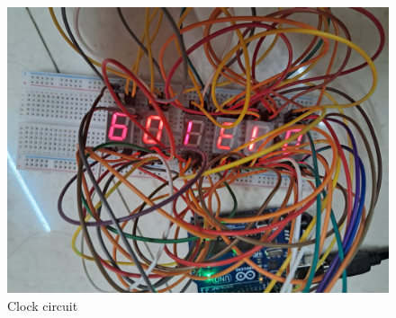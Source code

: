 \documentclass[journal]{IEEEtran}
\begin{document}
\begin{figure}[H]
    \centering
    \includegraphics[width=0.8\linewidth, angle = 180]{fig/C.jpeg} %
    \caption{Clock circuit}
    \label{fig:clk}
\end{figure}
\end{document}
